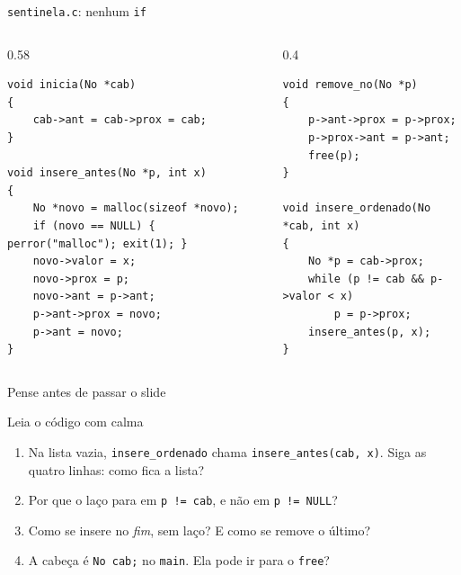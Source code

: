 \documentclass[aspectratio=169]{beamer}
\begin{document}
\begin{frame}[fragile]{\texttt{sentinela.c}: nenhum \texttt{if}}
  \begin{columns}[T]
    \begin{column}{0.58\textwidth}
\begin{lstlisting}[style=codC]
void inicia(No *cab)
{
    cab->ant = cab->prox = cab;
}

void insere_antes(No *p, int x)
{
    No *novo = malloc(sizeof *novo);
    if (novo == NULL) { perror("malloc"); exit(1); }
    novo->valor = x;
    novo->prox = p;
    novo->ant = p->ant;
    p->ant->prox = novo;
    p->ant = novo;
}
\end{lstlisting}
    \end{column}
    \begin{column}{0.4\textwidth}
\begin{lstlisting}[style=codC]
void remove_no(No *p)
{
    p->ant->prox = p->prox;
    p->prox->ant = p->ant;
    free(p);
}

void insere_ordenado(No *cab, int x)
{
    No *p = cab->prox;
    while (p != cab && p->valor < x)
        p = p->prox;
    insere_antes(p, x);
}
\end{lstlisting}
    \end{column}
  \end{columns}
\end{frame}

\begin{frame}{Pense antes de passar o slide}
  \begin{block}{Leia o código com calma}
    \begin{enumerate}
      \item Na lista vazia, \texttt{insere\_ordenado} chama
        \texttt{insere\_antes(cab, x)}. Siga as quatro linhas: como fica a
        lista?
      \item Por que o laço para em \texttt{p != cab}, e não em
        \texttt{p != NULL}?
      \item Como se insere no \emph{fim}, sem laço? E como se remove o
        último?
      \item A cabeça é \texttt{No cab;} no \texttt{main}. Ela pode ir para
        o \texttt{free}?
    \end{enumerate}
  \end{block}
\end{frame}
\end{document}
